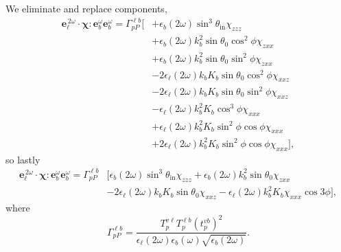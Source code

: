 We eliminate and replace components,
\begin{equation*}
\begin{split}
\mathbf{e}^{\,2\omega}_{\ell}\cdot
\boldsymbol{\chi}:\mathbf{e}^{\omega}_{b}\mathbf{e}^{\omega}_{b} = 
\Gamma^{\ell b}_{pP}
\bigg[
&+ \epsilon_{b}(2\omega)\sin^{3}\theta_{\mathrm{in}}\chi_{zzz}\\
&+ \epsilon_{b}(2\omega)k^{2}_{b}\sin\theta_{0}\cos^{2}\phi\chi_{zxx}\\
&+ \epsilon_{b}(2\omega)k^{2}_{b}\sin\theta_{0}\sin^{2}\phi\chi_{zxx}\\
&- 2\epsilon_{\ell}(2\omega)k_{b}K_{b}\sin\theta_{0}\cos^{2}\phi\chi_{xxz}\\
&- 2\epsilon_{\ell}(2\omega)k_{b}K_{b}\sin\theta_{0}\sin^{2}\phi\chi_{xxz}\\
&- \epsilon_{\ell}(2\omega)k^{2}_{b}K_{b}\cos^{3}\phi\chi_{xxx}\\
&+ \epsilon_{\ell}(2\omega)k^{2}_{b}K_{b}\sin^{2}\phi\cos\phi\chi_{xxx}\\
&+ 2\epsilon_{\ell}(2\omega)k^{2}_{b}K_{b}\sin^{2}\phi\cos\phi\chi_{xxx}
\bigg],
\end{split}
\end{equation*}
so lastly
\begin{equation*}
\begin{split}
\mathbf{e}^{\,2\omega}_{\ell}\cdot
\boldsymbol{\chi}:\mathbf{e}^{\omega}_{b}\mathbf{e}^{\omega}_{b} = 
\Gamma^{\ell b}_{pP}&
\bigg[
  \epsilon_{b}(2\omega)\sin^{3}\theta_{\mathrm{in}}\chi_{zzz}
+ \epsilon_{b}(2\omega)k^{2}_{b}\sin\theta_{0}\chi_{zxx}\\
&- 2\epsilon_{\ell}(2\omega)k_{b}K_{b}\sin\theta_{0}\chi_{xxz}
- \epsilon_{\ell}(2\omega)k^{2}_{b}K_{b}\chi_{xxx}\cos3\phi
\bigg],
\end{split}
\end{equation*}
where
\begin{equation*}
\Gamma^{\ell b}_{pP}=
\frac{T^{v\ell}_{p}T^{\ell b}_{p}\left(t^{vb}_{p}\right)^{2}}
  {\epsilon_{\ell}({2\omega})\epsilon_{b}(\omega)\sqrt{\epsilon_{b}(2\omega)}}.
\end{equation*}
